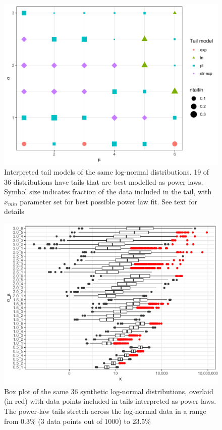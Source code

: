 \documentclass[
  12pt,
  a4paper, twoside]{book}
\begin{document}
\begin{figure}

{\centering \includegraphics[width=0.9\linewidth]{bookdown-demo_files/figure-latex/05-ln-tail-1} 

}

\caption[Log-normals, parameter values and tail model]{Interpreted tail models of the same log-normal distributions. 19 of 36 distributions have tails that are best modelled as power laws. Symbol size indicates fraction of the data included in the tail, with \(x_{min}\) parameter set for best possible power law fit. See text for details}\label{fig:05-ln-tail}
\end{figure}



\begin{figure}

{\centering \includegraphics[width=0.9\linewidth]{bookdown-demo_files/figure-latex/05-ln-pl-1} 

}

\caption[Log-normals, parameter values and power-law tails]{Box plot of the same 36 synthetic log-normal distributions, overlaid (in red) with data points included in tails interpreted as power laws. The power-law tails stretch across the log-normal data in a range from 0.3\% (3 data points out of 1000) to 23.5\%}\label{fig:05-ln-pl}
\end{figure}
\end{document}
